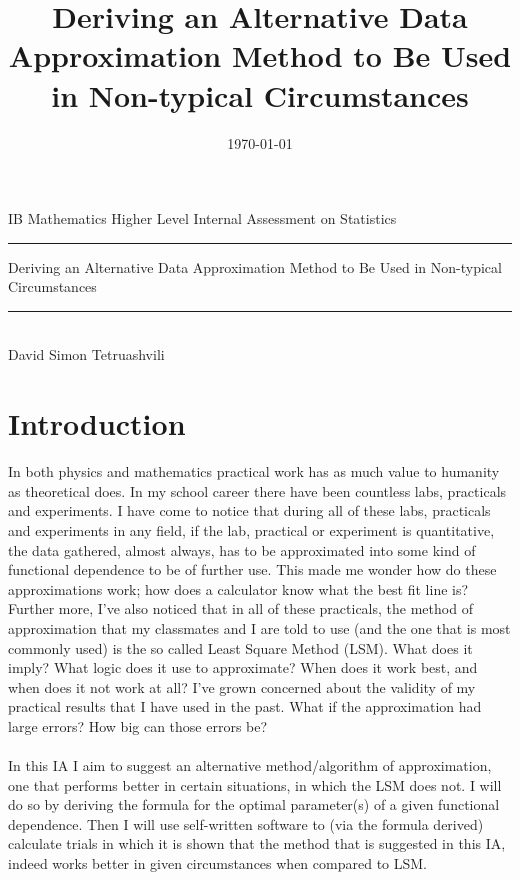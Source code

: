 
\title{Deriving an Alternative Data Approximation Method to Be Used in Non-typical  Circumstances}
\date{\today}


\begin{titlepage}
\begin{center}
IB Mathematics Higher Level Internal Assessment on Statistics 
\\ 
\rule{\textwidth}{0.25pt}
\linebreak
\Huge{Deriving an Alternative Data Approximation Method to Be Used in Non-typical  Circumstances}
\rule{\textwidth}{0.25pt} \\
[15cm]
\large {David Simon Tetruashvili} \\

\end{center}
\end{titlepage}
\newpage
\tableofcontents
{}
\newpage

\section{Introduction}
In both physics and mathematics practical work has as much value to humanity as theoretical does. In my school career there have been countless labs, practicals and experiments. I have come to notice that during all of these labs, practicals and experiments in any field, if the lab, practical or experiment is quantitative, the data gathered, almost always, has to be approximated into some kind of functional dependence to be of further use. This made me wonder how do these approximations work; how does a calculator know what the best fit line is? Further more, I've also noticed that in all of these practicals, the method of approximation that my classmates and I  are told to use (and the one that is most commonly used) is the so called Least Square Method (LSM). What does it imply? What logic does it use to approximate? When does it work best, and when does it not work at all? I've grown concerned about the validity of my practical results that I have used in the past. What if the approximation had large errors? How big can those errors be? \\
\\
In this IA I aim to suggest an alternative method/algorithm of approximation, one that performs better in certain situations, in which the LSM does not. I will do so by deriving the formula for the optimal parameter(s) of a given functional dependence. Then I will use self-written software to (via the formula derived) calculate trials in which it is shown that the method that is suggested in this IA, indeed works better in given circumstances when compared to LSM. 
